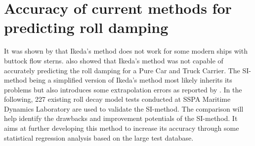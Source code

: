 \section{Accuracy of current methods for predicting roll damping}
\label{se:accuracy_SI_method}
It was shown by \parencite{kawahara_simple_2011} that Ikeda's method does not work for some modern ships with buttock flow sterns. \parencite{soder_assessment_2019} also showed that Ikeda's method was not capable of accurately predicting the roll damping for a Pure Car and Truck Carrier. The SI-method being a simplified version of Ikeda's method most likely inherits its problems but also introduces some extrapolation errors as reported by \parencite{rudakovic_application_2017}. In the following, 227 existing roll decay model tests conducted at SSPA Maritime Dynamics Laboratory are used to validate the SI-method. The comparison will help identify the drawbacks and improvement potentials of the SI-method. It aims at further developing this method to increase its accuracy through some statistical regression analysis based on the large test database.





